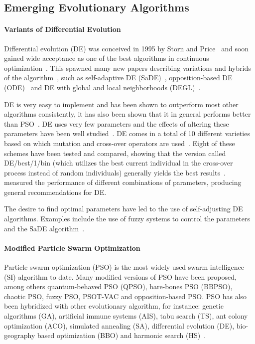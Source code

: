 \subsection{Emerging Evolutionary Algorithms}

\paragraph{Variants of Differential Evolution}

Differential evolution (DE) was conceived in 1995 by Storn and Price~\cite{storn1995differential} and soon gained wide acceptance as one of the best algorithms in continuous optimization~\cite{price1997differential}. This spawned many new papers describing variations and hybrids of the algorithm~\cite{5601760}, such as self-adaptive DE (SaDE)~\cite{qin2009differential}, opposition-based DE (ODE)~\cite{rahnamayan2008opposition} and DE with global and local neighborhoods (DEGL)~\cite{rahnamayan2008opposition}.

DE is very easy to implement and has been shown to outperform most other algorithms consistently, it has also been shown that it in general performs better than PSO~\cite{das2009differential, vesterstrom2004comparative}. DE uses very few parameters and the effects of altering these parameters have been well studied~\cite{5601760}. DE comes in a total of 10 different varieties based on which mutation and cross-over operators are used~\cite{price2006differential}. Eight of these schemes have been tested and compared, showing that the version called DE/best/1/bin (which utilizes the best current individual in the cross-over process instead of random individuals) generally yields the best results~\cite{mezura2006comparative}.~\cite{gamperle2002parameter} measured the performance of different combinations of parameters, producing general recommendations for DE.

The desire to find optimal parameters have led to the use of self-adjusting DE algorithms. Examples include the use of fuzzy systems to control the parameters~\cite{liu2005fuzzy} and the SaDE algorithm~\cite{qin2009differential}.

\paragraph{Modified Particle Swarm Optimization}

Particle swarm optimization (PSO) is the most widely used swarm intelligence (SI) algorithm to date. Many modified versions of PSO have been proposed, among others quantum-behaved PSO (QPSO), bare-bones PSO (BBPSO), chaotic PSO, fuzzy PSO, PSOT-VAC and opposition-based PSO. PSO has also been hybridized with other evolutionary algorithm, for instance: genetic algorithms (GA), artificial immune systems (AIS), tabu search (TS), ant colony optimization (ACO), simulated annealing (SA), differential evolution (DE), bio-geography based optimization (BBO) and harmonic search (HS)~\cite{zhang2015comprehensive}.

